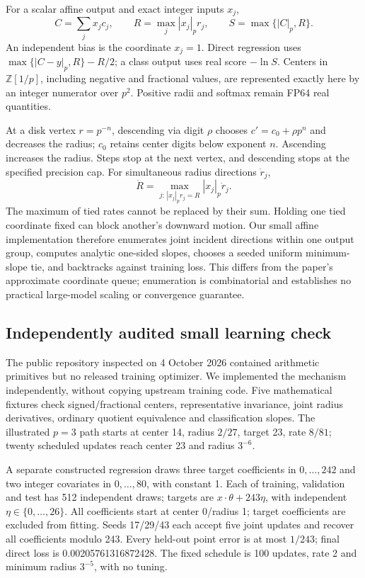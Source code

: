 \documentclass[11pt]{article}
\newcommand{\Z}{\mathbb{Z}}
\begin{document}
For a scalar affine output and exact integer inputs \(x_j\),
\begin{equation}
 C=\sum_jx_jc_j,\qquad R=\max_j|x_j|_p r_j,
 \qquad S=\max\{|C|_p,R\}.
\end{equation}
An independent bias is the coordinate \(x_j=1\). Direct regression uses
\(\max\{|C-y|_p,R\}-R/2\); a class output uses real score
\(-\ln S\). Centers in \(\Z[1/p]\), including negative and fractional
values, are represented exactly here by an integer numerator over \(p^2\).
Positive radii and softmax remain FP64 real quantities.

At a disk vertex \(r=p^{-n}\), descending via digit \(\rho\) chooses
\(c'=c_0+\rho p^n\) and decreases the radius; \(c_0\) retains center
digits below exponent \(n\). Ascending increases the radius. Steps stop
at the next vertex, and descending stops at the specified precision cap.
For simultaneous radius directions \(\dot r_j\),
\begin{equation}
 \dot R=\max_{j:\,|x_j|_pr_j=R}|x_j|_p\dot r_j.
\end{equation}
The maximum of tied rates cannot be replaced by their sum. Holding one tied
coordinate fixed can block another's downward motion. Our small affine
implementation therefore enumerates joint incident directions within one
output group, computes analytic one-sided slopes, chooses a seeded uniform
minimum-slope tie, and backtracks against training loss. This differs from
the paper's approximate coordinate queue; enumeration is combinatorial and
establishes no practical large-model scaling or convergence guarantee.

\subsection{Independently audited small learning check}

The public repository inspected on 4 October 2026 contained arithmetic
primitives but no released training optimizer. We implemented the mechanism
independently, without copying upstream training code. Five mathematical
fixtures check signed/fractional centers, representative invariance, joint
radius derivatives, ordinary quotient equivalence and classification slopes.
The illustrated \(p=3\) path starts at center 14, radius \(2/27\), target 23,
rate \(8/81\); twenty scheduled updates reach center 23 and radius \(3^{-6}\).

A separate constructed regression draws three target coefficients in
\(0,\ldots,242\) and two integer covariates in \(0,\ldots,80\), with
constant 1. Each of training, validation and test has 512 independent draws;
targets are \(x\cdot\theta+243\eta\), with independent
\(\eta\in\{0,\ldots,26\}\). All coefficients start at center 0/radius 1;
target coefficients are excluded from fitting. Seeds 17/29/43 each accept
five joint updates and recover all coefficients modulo 243. Every held-out
point error is at most \(1/243\); final direct loss is
0.00205761316872428. The fixed schedule is 100 updates, rate 2 and minimum
radius \(3^{-5}\), with no tuning.
\end{document}
